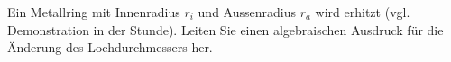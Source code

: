 Ein Metallring mit Innenradius $r_i$ und Aussenradius $r_a$ wird erhitzt (vgl. Demonstration in der Stunde). Leiten Sie einen algebraischen Ausdruck für die Änderung des Lochdurchmessers her.

